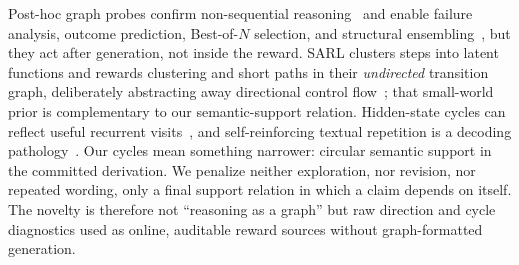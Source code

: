 Post-hoc graph probes confirm non-sequential reasoning~\citep{zhong2026chainsdag,matsutani2026rl} and enable failure analysis, outcome prediction, Best-of-$N$ selection, and structural ensembling~\citep{anonymous2026cot2graph,parulekar2026reasoningconsensus}, but they act after generation, not inside the reward. SARL clusters steps into latent functions and rewards clustering and short paths in their \emph{undirected} transition graph, deliberately abstracting away directional control flow~\citep{wang2026sarl}; that small-world prior is complementary to our semantic-support relation. Hidden-state cycles can reflect useful recurrent visits~\citep{minegishi2025topology}, and self-reinforcing textual repetition is a decoding pathology~\citep{duan2026circular}. Our cycles mean something narrower: circular semantic support in the committed derivation. We penalize neither exploration, nor revision, nor repeated wording, only a final support relation in which a claim depends on itself. The novelty is therefore not ``reasoning as a graph'' but raw direction and cycle diagnostics used as online, auditable reward sources without graph-formatted generation.

